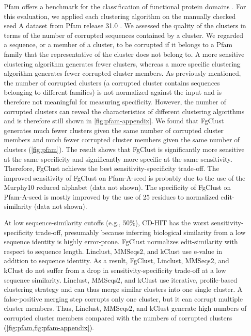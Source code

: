 \documentclass[11pt,letterpaper]{llncs2e/llncs}
\begin{document}
Pfam offers a benchmark for the classification of functional protein domains \citep{finn2016pfam}.
For this evaluation, we applied each clustering algorithm on
the manually checked seed A dataset from Pfam release 31.0 \citep{finn2016pfam}.
We assessed the quality of the clusters in terms of 
the number of corrupted sequences contained by a cluster.
We regarded a sequence, or a member of a cluster, to be corrupted if it belongs to a Pfam family that the representative of the cluster does not belong to.
A more sensitive clustering algorithm generates fewer clusters, whereas a more specific clustering algorithm generates fewer corrupted cluster members.
As previously mentioned, 
the number of corrupted clusters (a corrupted cluster contains sequences belonging to different families) is not normalized against the input and is therefore not meaningful for measuring specificity.
However, the number of corrupted clusters can reveal the characteristics of different clustering algorithms and is therefore still shown in \cref{fig:pfam-appendix}.
We found that FgClust generates much fewer clusters given the same number of corrupted cluster members and much fewer corrupted cluster members given the same number of clusters (\cref{fig:pfam}).
The result shows that FgClust is significantly more sensitive at the same specificity and significantly more specific at the same sensitivity.
Therefore, FgClust achieves the best sensitivity-specificity trade-off.
The improved sensitivity of FgClust on Pfam-A-seed is probably due to the use of the Murphy10 reduced alphabet (data not shown).
The specificity of FgClust on Pfam-A-seed is mostly improved by the use of 25 residues to normalized edit-similarity (data not shown). 

At low sequence-similarity cutoffs (e.g., 50\%),
CD-HIT has the worst sensitivity-specificity trade-off, presumably because inferring biological similarity from a low sequence identity is highly error-prone.
FgClust normalizes edit-similarity with respect to sequence length.
Linclust, MMSeqs2, and kClust use e-value in addition to sequence identity.
As a result, FgClust, Linclust, MMSeqs2, and kClust do not suffer from a drop in sensitivity-specificity trade-off at a low sequence similarity.
Linclust, MMSeqs2, and kClust use iterative, profile-based clustering strategy and can thus merge similar clusters into one single cluster.
A false-positive merging step corrupts only one cluster, but it can corrupt multiple cluster members.
Thus, Linclust, MMSeqs2, and kClust generate high numbers of corrupted cluster members compared with the numbers of corrupted clusters (\cref{fig:pfam,fig:pfam-appendix}).
\end{document}
